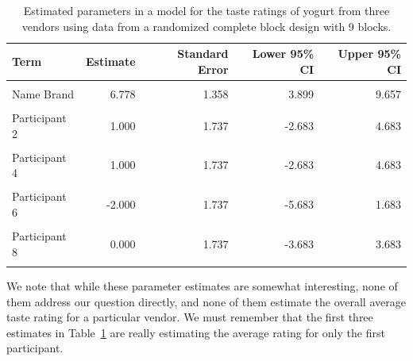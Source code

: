 \documentclass[
  letterpaper,
  DIV=11,
  numbers=noendperiod]{scrreprt}
\theoremstyle{plain}
\theoremstyle{definition}
\theoremstyle{definition}
\theoremstyle{remark}
\begin{document}
\hypertarget{tbl-blockconditions-summary}{}
\begin{table}
\caption{\label{tbl-blockconditions-summary}Estimated parameters in a model for the taste ratings of yogurt from
three vendors using data from a randomized complete block design with 9
blocks. }\tabularnewline

\centering
\begin{tabular}[t]{lrrrr}
\toprule
Term & Estimate & Standard Error & Lower 95\% CI & Upper 95\% CI\\
\midrule
\cellcolor{gray!6}{East Side Yogurt} & \cellcolor{gray!6}{7.000} & \cellcolor{gray!6}{1.358} & \cellcolor{gray!6}{4.121} & \cellcolor{gray!6}{9.879}\\
Name Brand & 6.778 & 1.358 & 3.899 & 9.657\\
\cellcolor{gray!6}{South Side Yogurt} & \cellcolor{gray!6}{6.222} & \cellcolor{gray!6}{1.358} & \cellcolor{gray!6}{3.343} & \cellcolor{gray!6}{9.101}\\
Participant 2 & 1.000 & 1.737 & -2.683 & 4.683\\
\cellcolor{gray!6}{Participant 3} & \cellcolor{gray!6}{1.000} & \cellcolor{gray!6}{1.737} & \cellcolor{gray!6}{-2.683} & \cellcolor{gray!6}{4.683}\\
\addlinespace
Participant 4 & 1.000 & 1.737 & -2.683 & 4.683\\
\cellcolor{gray!6}{Participant 5} & \cellcolor{gray!6}{0.333} & \cellcolor{gray!6}{1.737} & \cellcolor{gray!6}{-3.350} & \cellcolor{gray!6}{4.016}\\
Participant 6 & -2.000 & 1.737 & -5.683 & 1.683\\
\cellcolor{gray!6}{Participant 7} & \cellcolor{gray!6}{2.667} & \cellcolor{gray!6}{1.737} & \cellcolor{gray!6}{-1.016} & \cellcolor{gray!6}{6.350}\\
Participant 8 & 0.000 & 1.737 & -3.683 & 3.683\\
\addlinespace
\cellcolor{gray!6}{Participant 9} & \cellcolor{gray!6}{-2.000} & \cellcolor{gray!6}{1.737} & \cellcolor{gray!6}{-5.683} & \cellcolor{gray!6}{1.683}\\
\bottomrule
\end{tabular}
\end{table}

We note that while these parameter estimates are somewhat interesting,
none of them address our question directly, and none of them estimate
the overall average taste rating for a particular vendor. We must
remember that the first three estimates in
Table~\ref{tbl-blockconditions-summary} are really estimating the
average rating for only the first participant.
\end{document}
